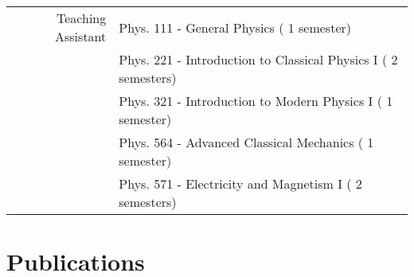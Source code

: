\documentclass[a4paper,10pt]{article}
\begin{document}
\begin{tabular}{r | p{14.05cm}}
\multicolumn{1}{r|}{Teaching Assistant}		& Phys. 111 - General Physics \hfill ( 1 semester\phantom{s})				\\
\multicolumn{1}{r|}{}						& Phys. 221 - Introduction to Classical Physics I  \hfill ( 2 semesters) 		\\ 
\multicolumn{1}{r|}{}						& Phys. 321 - Introduction to Modern Physics I \hfill ( 1 semester\phantom{s}) 	\\
\multicolumn{1}{r|}{}						& Phys. 564 - Advanced Classical Mechanics \hfill ( 1 semester\phantom{s})	\\
\multicolumn{1}{r|}{}						& Phys. 571 - Electricity and Magnetism I \hfill ( 2 semesters) 				\\
\end{tabular}

\vspace{3mm}
\section{Publications}
\end{document}
